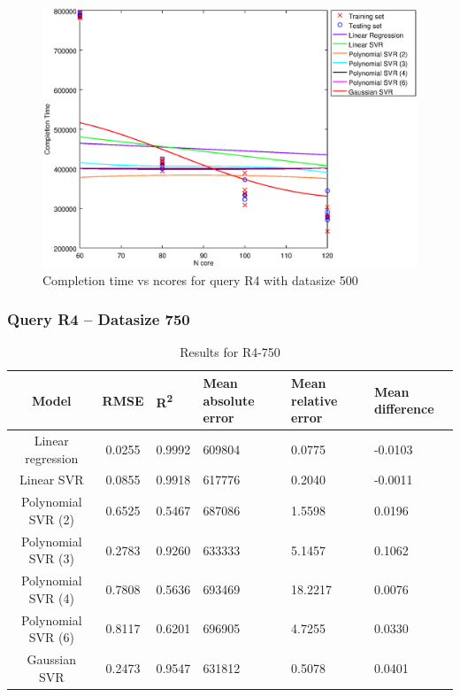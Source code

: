 \documentclass[a4paper,11pt]{article}
\begin{document}
\begin {figure}[hbtp]
\centering
\includegraphics[width=\textwidth]{output/R4_500_LINEAR_NCORE/plot_R4_500.eps}
\caption{Completion time vs ncores for query R4 with datasize 500}
\label{fig:all_linear_R4_500}
\end {figure}

\newpage
\subsubsection{Query R4 -- Datasize 750}
\begin{table}[H]
	\centering
	\begin{adjustbox}{center}
		\begin{tabular}{c | c M{1.2cm} M{2.5cm} M{2.5cm} M{1.8cm}}
			Model & RMSE & R\textsuperscript{2} & Mean absolute error & Mean relative error & Mean difference \tabularnewline
			\hline
			Linear regression & 0.0255 & 0.9992 & 609804 & 0.0775 & -0.0103 \\
			Linear SVR & 0.0855 & 0.9918 & 617776 & 0.2040 & -0.0011 \\
			Polynomial SVR (2) & 0.6525 & 0.5467 & 687086 & 1.5598 & 0.0196 \\
			Polynomial SVR (3) & 0.2783 & 0.9260 & 633333 & 5.1457 & 0.1062 \\
			Polynomial SVR (4) & 0.7808 & 0.5636 & 693469 & 18.2217 & 0.0076 \\
			Polynomial SVR (6) & 0.8117 & 0.6201 & 696905 & 4.7255 & 0.0330 \\
			Gaussian SVR & 0.2473 & 0.9547 & 631812 & 0.5078 & 0.0401 \\
		\end{tabular}
	\end{adjustbox}
	\\
	\caption{Results for R4-750}
	\label{fig:all_linear_R4_750}
\end{table}
\end{document}

